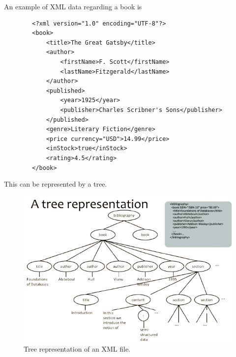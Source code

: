 \documentclass{article}
\begin{document}
    \begin{example}
      An example of XML data regarding a book is 
      \begin{lstlisting}
        <?xml version="1.0" encoding="UTF-8"?>
        <book>
            <title>The Great Gatsby</title>
            <author>
                <firstName>F. Scott</firstName>
                <lastName>Fitzgerald</lastName>
            </author>
            <published>
                <year>1925</year>
                <publisher>Charles Scribner's Sons</publisher>
            </published>
            <genre>Literary Fiction</genre>
            <price currency="USD">14.99</price>
            <inStock>true</inStock>
            <rating>4.5</rating>
        </book> 
      \end{lstlisting}
      This can be represented by a tree. 

      \begin{figure}[H]
        \centering 
        \includegraphics[scale=0.5]{img/tree_rep.png}
        \caption{Tree representation of an XML file.} 
        \label{fig:tree_rep}
      \end{figure}
    \end{example}
\end{document}
